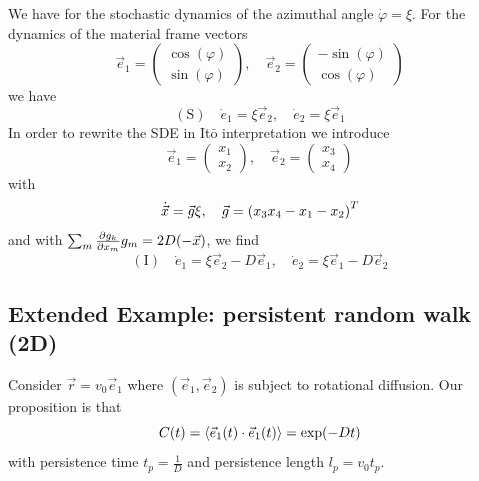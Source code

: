 \documentclass{notebook}
\begin{document}
We have for the stochastic dynamics of the azimuthal angle $\dot{\varphi} = \xi$. For the dynamics of the material frame vectors
%
\begin{equation*}
\vec{e}_1 = \begin{pmatrix} \cos(\varphi) \\ \sin(\varphi) \end{pmatrix}, \quad 
\vec{e}_2 = \begin{pmatrix} -\sin(\varphi) \\ \cos(\varphi) \end{pmatrix}
\end{equation*}
%
we have 
%
\begin{equation}
\mathrm{(S)} \quad \dot{e}_1 = \xi \vec{e}_2, \quad \dot{e}_2 = \xi \vec{e}_1
\end{equation}
%
In order to rewrite the SDE in It$\bar{\mathrm{o}}$ interpretation we introduce
%
\begin{equation*}
\vec{e}_1 = \begin{pmatrix} x_1 \\ x_2 \end{pmatrix}, \quad 
\vec{e}_2 = \begin{pmatrix} x_3 \\ x_4 \end{pmatrix}
\end{equation*}
%
with
%
\begin{equation*}
\dot{\vec{x}} = \vec{g} \xi, \quad 
\vec{g} = \left(x_3 \\ x_4 \\ -x_1 \\ -x_2 \right)^T
\end{equation*}
%
and with $\sum_m \pdv{g_k}{x_m} g_m = 2 D(-\vec{x})$, we find
%
\begin{equation}
\mathrm{(I)} \quad \dot{e}_1 = \xi \vec{e}_2 - D \vec{e}_1, \quad \dot{e}_2 = \xi \vec{e}_1 - D \vec{e}_2
\end{equation}
%

\subsection*{Extended Example: persistent random walk (2D)}

Consider $\vec{r} = v_0 \vec{e}_1$ where $(\vec{e}_1, \vec{e}_2)$ is subject to rotational diffusion. Our proposition is that
%
\begin{equation}
	C(t) = \expval{\vec{e}_1(t) \cdot \vec{e}_1(t)} = \exp(- D t)
\end{equation}
%
with persistence time $t_p = \frac{1}{D}$ and persistence length $l_p = v_0 t_p$. 
\end{document}
